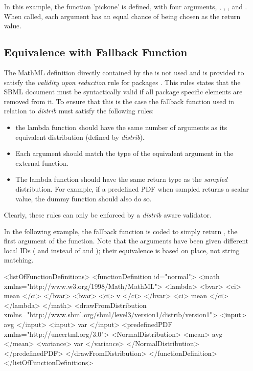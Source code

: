 \documentclass[draftspec]{sbmlpkgspec}
\newcommand{\distribshort}{\emph{distrib}\xspace}
\newcommand{\mathml}{MathML\xspace}
\begin{document}
In this example, the function 'pickone' is defined, with four arguments, , , , and .  When called, each argument has an equal chance of being chosen as the return value.


\subsection{Equivalence with Fallback Function}
\label{sec:fallbackfunc}

The \mathml definition directly contained by the
 is not used and is provided to
satisfy the \emph{validity upon reduction} rule for packages
\cite{sbmll3v1packrule}. This rules states that the SBML document must
be syntactically valid if all package specific elements are removed
from it. To ensure that this is the case the fallback function used in
relation to \distribshort must satisfy the following rules:

\begin{itemize}
\item the lambda function should have the same number of arguments as
  its equivalent distribution (defined by \distribshort).
\item Each argument should match the type of the equivalent argument
  in the external function.
\item The lambda function should have the same return type as the
  \emph{sampled} distribution. For example, if a predefined PDF when
  sampled returns a scalar value, the dummy function should also do so.
\end{itemize}

Clearly, these rules can only be enforced by a \distribshort aware validator.

In the following example, the fallback function is coded to simply return , the first argument of the function.  Note that the arguments have been given different local IDs ( and  instead of  and ); their equivalence is based on place, not string matching.

\begin{example}
  <listOfFunctionDefinitions>
    <functionDefinition id="normal">
      <math xmlns="http://www.w3.org/1998/Math/MathML">
        <lambda>
          <bvar>
            <ci> mean </ci>
          </bvar>
          <bvar>
            <ci> v </ci>
          </bvar>
          <ci> mean </ci>
        </lambda>
      </math>
      <drawFromDistribution xmlns="http://www.sbml.org/sbml/level3/version1/distrib/version1">
         <input> avg </input>
         <input> var </input>
         <predefinedPDF xmlns="http://uncertml.org/3.0">
           <NormalDistribution>
             <mean> avg </mean>
             <variance> var </variance>
           </NormalDistribution>
         </predefinedPDF>
      </drawFromDistribution>
    </functionDefinition>
  </listOfFunctionDefinitions>
\end{example}
\end{document}
